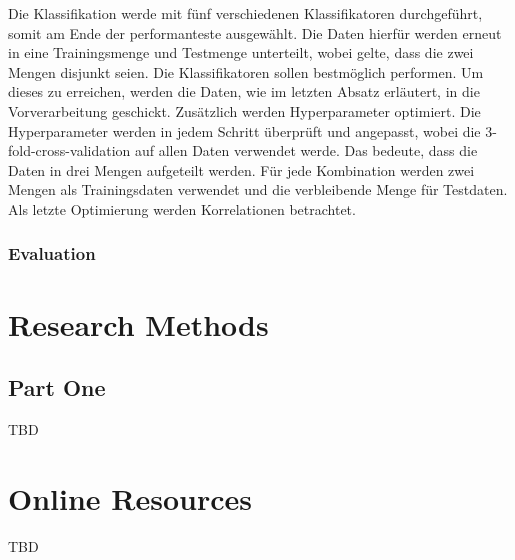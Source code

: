 \documentclass[sigplan,screen]{acmart}
\begin{document}
Die Klassifikation werde mit fünf verschiedenen Klassifikatoren durchgeführt, somit am Ende der performanteste ausgewählt. Die Daten hierfür werden erneut in eine Trainingsmenge und Testmenge unterteilt, wobei gelte, dass die zwei Mengen disjunkt seien. Die Klassifikatoren sollen bestmöglich performen. Um dieses zu erreichen, werden die Daten, wie im letzten Absatz erläutert, in die Vorverarbeitung geschickt. Zusätzlich werden Hyperparameter optimiert. Die Hyperparameter werden in jedem Schritt überprüft und angepasst, wobei die 3-fold-cross-validation auf allen Daten verwendet werde. Das bedeute, dass die Daten in drei Mengen aufgeteilt werden. Für jede Kombination werden zwei Mengen als Trainingsdaten verwendet und die verbleibende Menge für Testdaten. Als letzte Optimierung werden Korrelationen betrachtet.

\subsubsection{Evaluation}







\cite{Hohlfeld01}



\appendix

\section{Research Methods}

\subsection{Part One}

TBD


\section{Online Resources}

TBD
\end{document}
